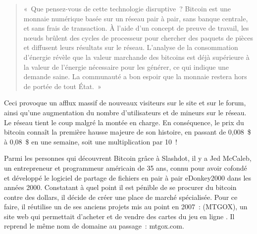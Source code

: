 \begin{quote}
«~Que pensez-vous de cette technologie disruptive~? Bitcoin est une monnaie numérique basée sur un réseau pair à pair, sans banque centrale, et sans frais de transaction. À l'aide d'un concept de preuve de travail, les nœuds brûlent des cycles de processeur pour chercher des paquets de pièces et diffusent leurs résultats sur le réseau. L'analyse de la consommation d'énergie révèle que la valeur marchande des bitcoins est déjà supérieure à la valeur de l'énergie nécessaire pour les générer, ce qui indique une demande saine. La communauté a bon espoir que la monnaie restera hors de portée de tout État.~»
\end{quote}

Ceci provoque un afflux massif de nouveaux visiteurs sur le site et sur le forum, ainsi qu'une augmentation du nombre d'utilisateurs et de mineurs sur le réseau. Le réseau tient le coup malgré la montée en charge. En conséquence, le prix du bitcoin connaît la première hausse majeure de son histoire, en passant de 0,008~\$ à 0,08~\$ en une semaine, soit une multiplication par 10~! %

Parmi les personnes qui découvrent Bitcoin grâce à Slashdot, il y a Jed McCaleb, un entrepreneur et programmeur américain de 35 ans, connu pour avoir cofondé et développé le logiciel de partage de fichiers en pair à pair eDonkey2000 dans les années 2000. Constatant à quel point il est pénible de se procurer du bitcoin contre des dollars, il décide de créer une place de marché spécialisée. Pour ce faire, il réutilise un de ses anciens projets mis au point en 2007~:  (MTGOX), un site web qui permettait d'acheter et de vendre des cartes du jeu en ligne . Il reprend le même nom de domaine au passage~: mtgox.com.

